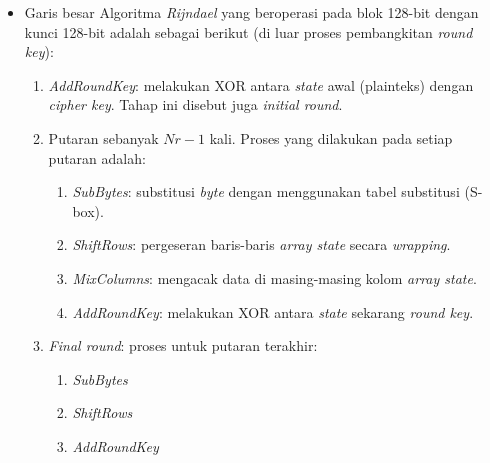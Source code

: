 \documentclass{article}
\begin{document}

\begin{itemize}
    \item Garis besar Algoritma \textit{Rijndael} yang beroperasi pada blok 128-bit dengan kunci 128-bit adalah sebagai berikut (di luar proses pembangkitan \textit{round key}):
    \begin{enumerate}
        \item \textit{AddRoundKey}: melakukan XOR antara \textit{state} awal (plainteks) dengan \textit{cipher key}. Tahap ini disebut juga \textit{initial round}.
        \item Putaran sebanyak $Nr - 1$ kali. Proses yang dilakukan pada setiap putaran adalah:
        \begin{enumerate}
            \item \textit{SubBytes}: substitusi \textit{byte} dengan menggunakan tabel substitusi (S-box).
            \item \textit{ShiftRows}: pergeseran baris-baris \textit{array state} secara \textit{wrapping}.
            \item \textit{MixColumns}: mengacak data di masing-masing kolom \textit{array state}.
            \item \textit{AddRoundKey}: melakukan XOR antara \textit{state} sekarang \textit{round key}.
        \end{enumerate}
        \item \textit{Final round}: proses untuk putaran terakhir:
        \begin{enumerate}
            \item \textit{SubBytes}
            \item \textit{ShiftRows}
            \item \textit{AddRoundKey}
        \end{enumerate}
    \end{enumerate}
\end{itemize}
\end{document}

